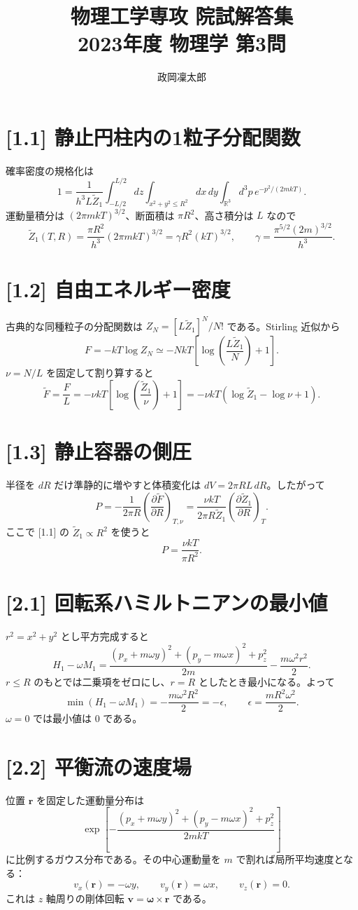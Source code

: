 \documentclass[11pt,a4paper]{article}
\title{物理工学専攻 院試解答集\\2023年度 物理学 第3問}
\author{政岡凜太郎}
\date{}
\begin{document}
\maketitle

\section*{[1.1] 静止円柱内の1粒子分配関数}
確率密度の規格化は
\[
1=\frac1{h^3L\widetilde Z_1}\int_{-L/2}^{L/2}dz
\int_{x^2+y^2\le R^2}dx\,dy\int_{\mathbb R^3}d^3p\,
e^{-p^2/(2mkT)}.
\]
運動量積分は $(2\pi mkT)^{3/2}$、断面積は $\pi R^2$、高さ積分は $L$ なので
\[
\widetilde Z_1(T,R)=\frac{\pi R^2}{h^3}(2\pi mkT)^{3/2}
=\boxed{\gamma R^2(kT)^{3/2}},\qquad
\gamma=\frac{\pi^{5/2}(2m)^{3/2}}{h^3}.
\]

\section*{[1.2] 自由エネルギー密度}
古典的な同種粒子の分配関数は $Z_N=[L\widetilde Z_1]^N/N!$ である。Stirling 近似から
\[
F=-kT\log Z_N\simeq -NkT\left[\log\left(\frac{L\widetilde Z_1}{N}\right)+1\right].
\]
$\nu=N/L$ を固定して割り算すると
\[
\boxed{\widetilde F=\frac FL=-\nu kT\left[\log\left(\frac{\widetilde Z_1}{\nu}\right)+1\right]
=-\nu kT(\log\widetilde Z_1-\log\nu+1)}.
\]

\section*{[1.3] 静止容器の側圧}
半径を $dR$ だけ準静的に増やすと体積変化は $dV=2\pi RL\,dR$。したがって
\[
P=-\frac1{2\pi R}\left(\frac{\partial\widetilde F}{\partial R}\right)_{T,\nu}
=\boxed{\frac{\nu kT}{2\pi R\widetilde Z_1}\left(\frac{\partial\widetilde Z_1}{\partial R}\right)_T}.
\]
ここで [1.1] の $\widetilde Z_1\propto R^2$ を使うと
\[
\boxed{P=\frac{\nu kT}{\pi R^2}}.
\]

\section*{[2.1] 回転系ハミルトニアンの最小値}
$r^2=x^2+y^2$ とし平方完成すると
\[
H_1-\omega M_1
=\frac{(p_x+m\omega y)^2+(p_y-m\omega x)^2+p_z^2}{2m}
-\frac{m\omega^2r^2}{2}.
\]
$r\le R$ のもとでは二乗項をゼロにし、$r=R$ としたとき最小になる。よって
\[
\boxed{\min(H_1-\omega M_1)=-\frac{m\omega^2R^2}{2}=-\epsilon},\qquad
\epsilon=\frac{mR^2\omega^2}{2}.
\]
$\omega=0$ では最小値は $0$ である。

\section*{[2.2] 平衡流の速度場}
位置 $\boldsymbol r$ を固定した運動量分布は
\[
\exp\!\left[-\frac{(p_x+m\omega y)^2+(p_y-m\omega x)^2+p_z^2}{2mkT}\right]
\]
に比例するガウス分布である。その中心運動量を $m$ で割れば局所平均速度となる：
\[
\boxed{v_x(\boldsymbol r)=-\omega y,\qquad v_y(\boldsymbol r)=\omega x,\qquad v_z(\boldsymbol r)=0}.
\]
これは $z$ 軸周りの剛体回転 $\boldsymbol v=\boldsymbol\omega\times\boldsymbol r$ である。
\end{document}
